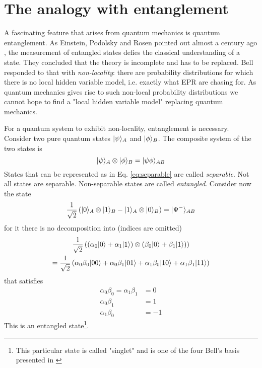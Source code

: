 \section{The analogy with entanglement}
	A fascinating feature that arises from quantum mechanics is quantum entanglement. As Einstein, Podolsky and Rosen pointed out almost a century ago \cite{einstein1935}, 
	the measurement of entangled states defies the classical understanding of a state. 
	They concluded that the theory is incomplete and has to be replaced.
	Bell responded to that with \emph{non-locality}\cite{Bell64}: there are probability distributions for which there is no local hidden variable model, i.e. exactly what EPR are chasing for.
	As quantum mechanics gives rise to such non-local probability distributions we cannot hope to find a "local hidden variable model" replacing quantum mechanics.
	
	For a quantum system to exhibit non-locality, entanglement is necessary.
	Consider two pure quantum states $|\psi \rangle_A$ and $|\phi \rangle_B$.
	The composite system of the two states is
	\begin{equation}\label{eq:separable}
		|\psi \rangle_A \otimes |\phi \rangle_B = |\psi\phi \rangle_{AB}
	\end{equation}
	States that can be represented as in Eq. \ref{eq:separable} are called \emph{separable}.
	Not all states are separable. Non-separable states are called \emph{entangled}.
	Consider now the state
	\begin{equation}
		\frac{1}{\sqrt{2}}\left(|0 \rangle_A\otimes|1 \rangle_B - |1 \rangle_A\otimes|0 \rangle_B\right) = |\Psi^{-} \rangle_{AB}
	\end{equation}
	for it there is no decomposition into (indices are omitted)
	\begin{multline}
		\frac{1}{\sqrt{2}}\left( (\alpha_0|0 \rangle+\alpha_1|1 \rangle)\otimes (\beta_0|0 \rangle + \beta_1|1 \rangle) \right) \\
		= \frac{1}{\sqrt{2}} \left( \alpha_0\beta_0|00 \rangle + \alpha_0\beta_1|01 \rangle + \alpha_1\beta_0|10 \rangle + \alpha_1\beta_1|11 \rangle \right)
	\end{multline}
	that satisfies 
	\begin{align}
	\alpha_0\beta_0 = \alpha_1\beta_1 & = 0 \\
	\alpha_0\beta_1 & = 1\\
	\alpha_1\beta_0 & = -1
	\end{align}
	This is an entangled state\footnote{This particular state is called "singlet" and is one of the four Bell's basis presented in \cite{Bell64}}.
	
